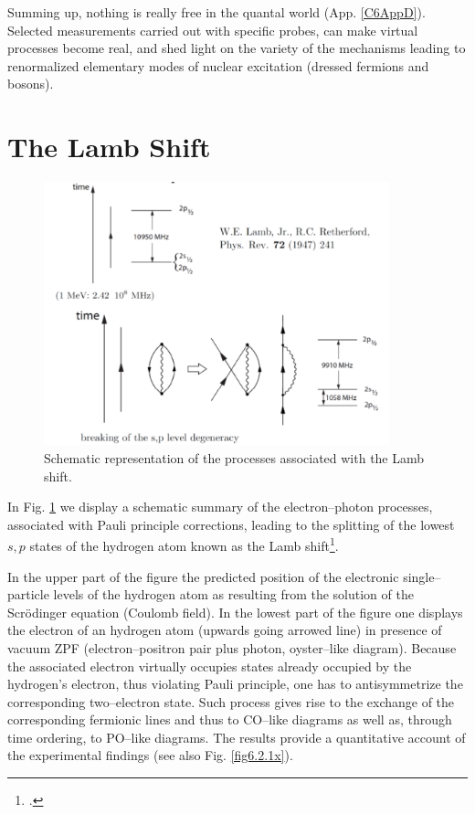 \begin{subappendices}
 Summing up, nothing is really free in the quantal world (App. \ref{C6AppD}). Selected measurements carried out with specific probes, can make virtual processes become real, and shed light on the variety of the mechanisms leading to renormalized elementary modes of nuclear excitation (dressed fermions and bosons).
\section{The Lamb Shift}\label{C6AppC}
 \begin{figure}
\centerline{\includegraphics*[width=10cm,angle=0]{C6/figs_C6/fig6_C3}}
\caption{Schematic representation of the processes associated with the Lamb shift.}\label{fig6_C1}
\end{figure}
In Fig. \ref{fig6_C1} we display a schematic summary of the electron--photon processes, associated with Pauli principle corrections, leading to the splitting of the lowest $s,p$ states of the hydrogen atom known as the Lamb shift\footnote{\cite{Lamb:47,Kroll:49}.}.


In the upper part of the figure the predicted position of the electronic single--particle levels of the hydrogen atom as resulting from the solution of the Scr\"{o}dinger equation (Coulomb field). In the lowest part of the figure one displays the electron of an hydrogen atom (upwards going arrowed line) in presence of vacuum ZPF (electron--positron pair plus photon, oyster--like diagram).  Because the associated electron virtually occupies states already occupied by the hydrogen's electron, thus violating Pauli principle, one has to antisymmetrize the corresponding two--electron state. Such process gives rise to the exchange of the corresponding fermionic lines and thus to CO--like diagrams as well as, through time ordering, to PO--like diagrams. The results provide a quantitative account of the experimental findings (see also Fig. \ref{fig6.2.1x}).  

\end{subappendices}
